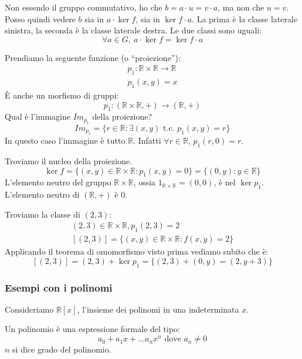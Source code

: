 Non essendo il gruppo commutativo, ho che $b = a \cdot u = v \cdot a$, ma non che $u = v$. Posso quindi vedere $b$ sia in $ a \cdot \ker f$, sia in $\ker f \cdot a$. La prima \`e la classe laterale sinistra, la seconda \`e la classe laterale destra. Le due classi sono uguali:
\[
\forall a \in G ,\ a \cdot \ker f = \ker f \cdot a
\]
\begin{exmp}
Prendiamo la seguente funzione (o ``proiezione''):
\begin{gather*}
p_1 : \mathbb{R} \times \mathbb{R} \to \mathbb{R} \\
p_1 (x, y) = x
\end{gather*}
\`E anche un morfismo di gruppi:
\[
p_1 : (\mathbb{R} \times \mathbb{R}, +) \to (\mathbb{R}, +)
\]
Qual \`e l'immagine $Im_{p_1}$ della proiezione?
\[
Im_{p_1} = \{ r \in \mathbb{R} : \exists (x, y) \text{ t.c. } p_1 (x, y) = r \}
\]
In questo caso l'immagine \`e tutto $\mathbb{R}$. Infatti $\forall r \in \mathbb{R}$, $ p_1(r, 0) = r$.

Troviamo il nucleo della proiezione.
\[
\ker f = \{ (x, y) \in \mathbb{R} \times \mathbb{R} : p_1(x, y) = 0 \} = \{ (0, y) : y \in \mathbb{R} \}
\]
L'elemento neutro del gruppo $\mathbb{R} \times \mathbb{R}$, ossia $1_{\mathbb{R} \times \mathbb{R}} = (0, 0)$, \`e nel $ \ker p_1$. L'elemento neutro di $(\mathbb{R}, +)$ \`e 0.

Troviamo la classe di $(2, 3)$:
\begin{gather*}
(2, 3) \in \mathbb{R} \times \mathbb{R}, p_1(2, 3) = 2 \\
[(2, 3)] = \{ (x, y) \in \mathbb{R} \times \mathbb{R} : f(x, y) = 2\}
\end{gather*}
Applicando il teorema di omomorfismo visto prima vediamo subito che \`e:
\[
[(2,3)] = (2, 3) + \ker p_1 = \{ (2, 3) + (0, y) = (2, y + 3) \}
\]
\end{exmp}

\subsubsection{Esempi con i polinomi}

Consideriamo $\mathbb{R}[x]$, l'insieme dei polinomi in una indeterminata $x$.

\begin{defn}[Polinomio]
Un polinomio \`e una espressione formale del tipo:
\[
a_0 + a_1 x + \dots a_n x^n \text{ dove } a_n \neq 0
\]
$n$ si dice grado del polinomio.
\end{defn}

